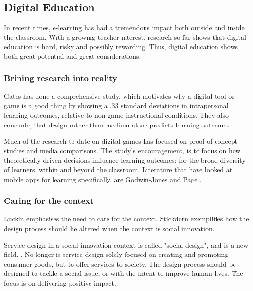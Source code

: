     

    \subsection{Digital Education}

    In recent times, e-learning has had a tremendous impact both outside and inside the classroom. With a growing teacher interest, research so far shows that digital education is hard, risky and possibly rewarding. \cite{luckin} Thus, digital education shows both great potential and great considerations.

    \subsubsection{Brining research into reality}

    Gates \cite{gates} has done a comprehensive study, which motivates why a digital tool or game is a good thing by showing a .33 standard deviations in intrapersonal learning outcomes, relative to non-game instructional conditions. They also conclude, that design rather than medium alone predicts learning outcomes.

    Much of the research to date on digital games has focused on proof-of-concept studies and media comparisons. The study's encouragement, is to focus on how theoretically-driven decisions influence learning outcomes: for the broad diversity of learners, within and beyond the classroom. Literature that have looked at mobile apps for learning specifically, are Godwin-Jones \cite{godwin-jones} and Page \cite{page}.



    \subsubsection{Caring for the context}
    Luckin \cite{luckin} emphasises the need to care for the context. Stickdorn \cite{stickdorn} exemplifies how the design process should be altered when the context is social innovation.

    Service design in a social innovation context is called "social design", and is a new field. \cite{stickdorn}. No longer is service design solely focused on creating and promoting consumer goods, but to offer services to society. The design process should be designed to tackle a social issue, or with the intent to improve human lives. The focus is on delivering positive impact.

